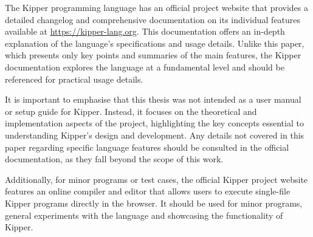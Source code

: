 
The Kipper programming language has an official project website that provides a detailed changelog and comprehensive documentation on its individual features available at \url{https://kipper-lang.org}. This documentation offers an in-depth explanation of the language’s specifications and usage details. Unlike this paper, which presents only key points and summaries of the main features, the Kipper documentation explores the language at a fundamental level and should be referenced for practical usage details.

It is important to emphasise that this thesis was not intended as a user manual or setup guide for Kipper. Instead, it focuses on the theoretical and implementation aspects of the project, highlighting the key concepts essential to understanding Kipper’s design and development. Any details not covered in this paper regarding specific language features should be consulted in the official documentation, as they fall beyond the scope of this work.

Additionally, for minor programs or test cases, the official Kipper project website features an online compiler and editor that allows users to execute single-file Kipper programs directly in the browser. It should be used for minor programs, general experiments with the language and showcasing the functionality of Kipper.

